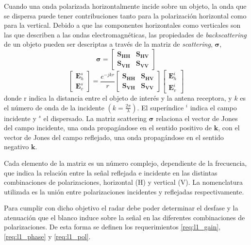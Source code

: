 Cuando una onda polarizada horizontalmente incide sobre un objeto, la onda que se dispersa puede tener contribuciones tanto para la polarización horizontal como para la vertical. Debido a que las componentes horizontales como verticales son las que describen a las ondas electromagnéticas, las propiedades de \textit{backscattering} de un objeto pueden ser descriptas a través de la matriz de \textit{scattering}, $\bm{\sigma}$,
\begin{equation}
  \bm{\sigma} = \begin{bmatrix} \bm{S}_{\bm{HH}} & \bm{S}_{\bm{HV}} \\ \bm{S}_{\bm{VH}} & \bm{S}_{\bm{VV}} \end{bmatrix}
\end{equation}
\begin{equation}
  \begin{bmatrix} \bm{E}_h^s \\ \bm{E}_v^s \end{bmatrix} = \dfrac{e^{-jkr}}{r} \begin{bmatrix} \bm{S}_{\bm{HH}} & \bm{S}_{\bm{HV}} \\ \bm{S}_{\bm{VH}} & \bm{S}_{\bm{VV}} \end{bmatrix} \begin{bmatrix} \bm{E}_h^i \\ \bm{E}_v^i \end{bmatrix}
\end{equation}
donde r indica la distancia entre el objeto de interés y la antena receptora, y $k$ es el número de onda de la incidente $(k = \frac{2\pi}{\lambda})$. El superíndice $^i$ indica el campo incidente y $^s$ el dispersado. La matriz scattering $\bm{\sigma}$ relaciona el vector de Jones del campo incidente, una onda propagándose en el sentido positivo de $\bm{k}$, con el vector de Jones del campo reflejado, una onda propagándose en el sentido negativo $\bm{k}$. 

Cada elemento de la matriz es un número complejo, dependiente de la frecuencia, que indica la relación entre la señal reflejada e incidente en las distintas combinaciones de polarizaciones, horizontal (H) y vertical (V). La nomenclatura utilizada es la unión entre polarizaciones incidentes y reflejadas respectivamente.

Para cumplir con dicho objetivo el radar debe poder determinar el desfase y la atenuación que el blanco induce sobre la señal en las diferentes combinaciones de polarizaciones. De esta forma se definen los requerimientos \ref{req:l1_gain}, \ref{req:l1_phase} y \ref{req:l1_pol}.

